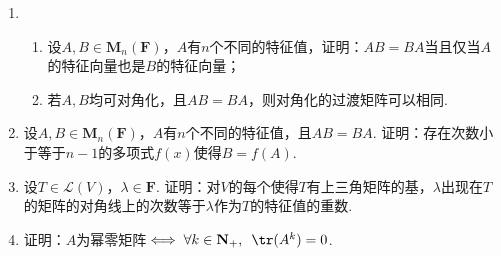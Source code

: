 \begin{enumerate}
          {\kaishu 注：实际上相似这一性质与数域无关，本题是这一结论的特例.}

    \item \begin{enumerate}
              \item 设$A,B\in \mathbf{M}_n(\mathbf{F})$，$A$有$n$个不同的特征值，证明：$AB=BA$当且仅当$A$的特征向量也是$B$的特征向量；

              \item 若$A,B$均可对角化，且$AB=BA$，则对角化的过渡矩阵可以相同.
          \end{enumerate}

    \item 设$A,B\in \mathbf{M}_n(\mathbf{F})$，$A$有$n$个不同的特征值，且$AB=BA$. 证明：存在次数小于等于$n-1$的多项式$f(x)$使得$B=f(A)$.

    \item 设$T\in \mathcal{L}(V)$，$\lambda\in\mathbf{F}$. 证明：对$V$的每个使得$T$有上三角矩阵的基，$\lambda$出现在$T$的矩阵的对角线上的次数等于$\lambda$作为$T$的特征值的重数.

    \item 证明：$A$为幂零矩阵$\iff \forall k \in \mathbf{N}_+,\enspace\tr(A^k)=0$.
\end{enumerate}
